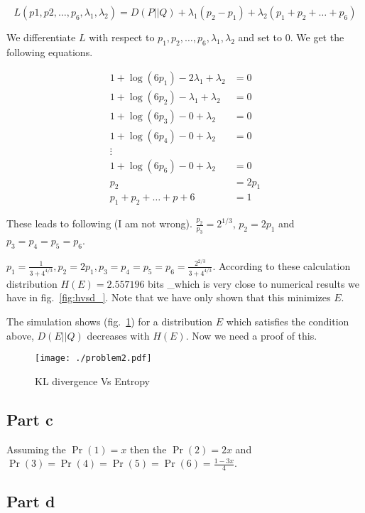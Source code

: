 \documentclass[]{article}
\begin{document}
\[L(p1,p2,\ldots,p_6,\lambda_1,\lambda_2) = D(P||Q) + \lambda_1(p_2-p_1) + 
\lambda_2(p_1+p_2+\ldots+p_6)\]

We differentiate \(L\) with respect to
\(p_1,p_2,\ldots,p_6,\lambda_1,\lambda_2\) and set to 0. We get the
following equations.

\[
\begin{aligned}
1 + \log( 6p_1 ) - 2 \lambda_1 + \lambda_2 &= 0 \\
1 + \log( 6p_2 ) - \lambda_1 + \lambda_2 &= 0 \\
1 + \log( 6p_3 ) - 0 + \lambda_2 &= 0 \\
1 + \log( 6p_4 ) - 0 + \lambda_2 &= 0 \\
\vdots \\
1 + \log( 6p_6 ) - 0 + \lambda_2 &= 0 \\
p_2 &= 2 p_1 \\
p_1 + p_2 + \dots + p+6 &= 1 
\end{aligned}
\]

These leads to following (I am not wrong).
\(\frac{p_2}{p_3} = 2^{1/3}\), \(p_2=2p_1\) and \(p_3=p_4=p_5=p_6\).

\(p_1=\frac{1}{3 + 4^{4/3}}, p_2=2p_1,p_3=p_4=p_5=p_6=\frac{2^{2/3}}{3+4^{4/3}}\).
According to these calculation distribution \(H(E)=2.557196\) bits
\_which is very close to numerical results we have in
fig.~\ref{fig:hvsd_}. Note that we have only shown that this minimizes
\(E\). 

The simulation shows (fig.~\ref{fig:hvsd}) for a distribution \(E\)
which satisfies the condition above, \(D(E||Q)\) decreases with
\(H(E)\). Now we need a proof of this.

\begin{figure}[htbp]
\centering
\texttt{[image: ./problem2.pdf]}
\caption{KL divergence Vs Entropy}\label{fig:hvsd}
\end{figure}

\subsection{Part c}\label{part-c}

Assuming the \(\Pr(1)=x\) then the \(\Pr(2)=2x\) and
\(\Pr(3)=\Pr(4)=\Pr(5)=\Pr(6)=\frac{1-3x}{4}\).


\subsection{Part d}\label{part-d}
\end{document}
